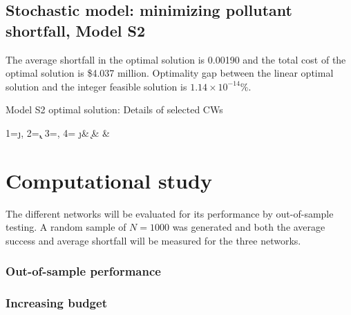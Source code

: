\documentclass[preprint,12pt,authoryear]{elsarticle}
\begin{document}
\subsection{Stochastic model: minimizing pollutant shortfall, Model S2}
The average shortfall in the optimal solution is 0.00190 and the total cost of the optimal solution is \$4.037 million. Optimality gap between the linear optimal solution and the integer feasible solution is $1.14 \times 10^{-14} \%$.

\begin{table}[htb]
	\begin{center}
	\caption{Model S2 optimal solution: Details of selected CWs}\label{table:ress2}
            		{1=\j, 2=\k, 3=\q, 4=\visual}
            		{\j & \k & \q & \visual}
	\end{center}
\end{table}

\section{Computational study}
The different networks will be evaluated for its performance by out-of-sample testing. A random sample of $N=1000$ was generated and both the average success and average shortfall will be measured for the three networks. 

\subsubsection{Out-of-sample performance}

\subsubsection{Increasing budget}
\end{document}
